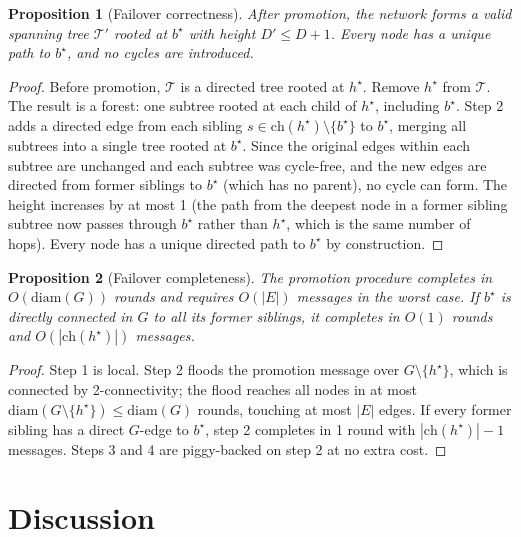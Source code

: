 \documentclass{article}
\newtheorem{proposition}{Proposition}
\begin{document}
\begin{proposition}[Failover correctness]
\label{prop:failover}
    After promotion, the network forms a valid spanning tree $\mathcal{T}'$ rooted at
    $b^\star$ with height $D' \leq D + 1$. Every node has a unique path to $b^\star$,
    and no cycles are introduced.
\end{proposition}

\begin{proof}
    Before promotion, $\mathcal{T}$ is a directed tree rooted at $h^\star$. Remove
    $h^\star$ from $\mathcal{T}$. The result is a forest: one subtree rooted at each
    child of $h^\star$, including $b^\star$. Step 2 adds a directed edge from each
    sibling $s \in \mathrm{ch}(h^\star) \setminus \{b^\star\}$ to $b^\star$, merging
    all subtrees into a single tree rooted at $b^\star$. Since the original edges within
    each subtree are unchanged and each subtree was cycle-free, and the new edges are
    directed from former siblings to $b^\star$ (which has no parent), no cycle can form.
    The height increases by at most 1 (the path from the deepest node in a former sibling
    subtree now passes through $b^\star$ rather than $h^\star$, which is the same number
    of hops). Every node has a unique directed path to $b^\star$ by construction.
\end{proof}

\begin{proposition}[Failover completeness]
\label{prop:completeness}
    The promotion procedure completes in $O(\mathrm{diam}(G))$ rounds and requires
    $O(|E|)$ messages in the worst case. If $b^\star$ is directly connected in $G$ to
    all its former siblings, it completes in $O(1)$ rounds and $O(|\mathrm{ch}(h^\star)|)$
    messages.
\end{proposition}

\begin{proof}
    Step 1 is local. Step 2 floods the promotion message over $G \setminus \{h^\star\}$,
    which is connected by 2-connectivity; the flood reaches all nodes in at most
    $\mathrm{diam}(G \setminus \{h^\star\}) \leq \mathrm{diam}(G)$ rounds, touching at
    most $|E|$ edges. If every former sibling has a direct $G$-edge to $b^\star$, step 2
    completes in 1 round with $|\mathrm{ch}(h^\star)| - 1$ messages. Steps 3 and 4 are
    piggy-backed on step 2 at no extra cost.
\end{proof}

\section{Discussion}
\end{document}

